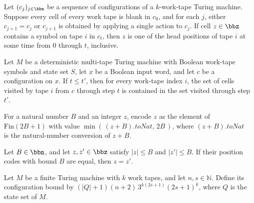 \begin{lemma}
\label{Turing.MultiTapeTM.ConfigCount.mem_image_workTapePos_of_ne_none}
\leanok
{}
Let $(c_j)_{j\in\bbn}$ be a sequence of configurations of a $k$-work-tape Turing
machine. Suppose every cell of every work tape is blank in $c_0$, and for each $j$,
either $c_{j+1}=c_j$ or $c_{j+1}$ is obtained by applying a single action to $c_j$. If
cell $z\in\bbz$ contains a symbol on tape $i$ in $c_t$, then $z$ is one of the head
positions of tape $i$ at some time from $0$ through $t$, inclusive.
\end{lemma}

\begin{lemma}
\label{Turing.MultiTapeTM.visitedByTapeHead_mono}
\leanok
{}
Let $M$ be a deterministic multi-tape Turing machine with Boolean work-tape symbols and
state set $S$, let $x$ be a Boolean input word, and let $c$ be a configuration on $x$.
If $t\leq t'$, then for every work-tape index $i$, the set of cells visited by tape $i$
from $c$ through step $t$ is contained in the set visited through step $t'$.
\end{lemma}

\begin{definition}
\label{Turing.MultiTapeTM.ConfigCount.posCode}
\leanok
For a natural number $B$ and an integer $z$, encode $z$ as the element of
$\mathrm{Fin}(2B+1)$ with value $\min(\,(z+B).toNat,\,2B\,)$, where $(z+B).toNat$ is the
natural-number conversion of $z+B$.
\end{definition}

\begin{lemma}
\label{Turing.MultiTapeTM.ConfigCount.posCode_injOn}
\leanok
{}
Let $B\in\bbn$, and let $z,z'\in\bbz$ satisfy $|z|\le B$ and $|z'|\le B$. If their
position codes with bound $B$ are equal, then $z=z'$.
\end{lemma}

\begin{definition}
\label{Turing.FinTM.configBound}
\leanok
{}
Let $M$ be a finite Turing machine with $k$ work tapes, and let $n,s\in\mathbb{N}$.
Define its configuration bound by $(|Q|+1)(n+2)\,3^{k(2s+1)}(2s+1)^k$, where $Q$ is the
state set of $M$.
\end{definition}

